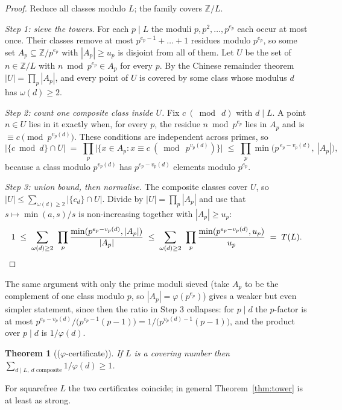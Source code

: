 \documentclass[11pt]{article}
\newtheorem{theorem}{Theorem}
\theoremstyle{definition}
\theoremstyle{remark}
\newcommand{\Z}{\mathbb{Z}}
\newcommand{\moniker}[1]{\textup{(#1)}}
\begin{document}
\begin{proof}
Reduce all classes modulo $L$; the family covers $\Z/L$.

\emph{Step 1: sieve the towers.} For each $p \mid L$ the moduli $p, p^2, \dots, p^{e_p}$ each occur at most once. Their classes remove at most $p^{e_p-1} + \dots + 1$ residues modulo $p^{e_p}$, so some set $A_p \subseteq \Z/p^{e_p}$ with $|A_p| \ge u_p$ is disjoint from all of them. Let $U$ be the set of $n \in \Z/L$ with $n \bmod p^{e_p} \in A_p$ for every $p$. By the Chinese remainder theorem $|U| = \prod_p |A_p|$, and every point of $U$ is covered by some class whose modulus $d$ has $\omega(d) \ge 2$.

\emph{Step 2: count one composite class inside $U$.} Fix $c \ (\bmod\ d)$ with $d \mid L$. A point $n \in U$ lies in it exactly when, for every $p$, the residue $n \bmod p^{e_p}$ lies in $A_p$ and is $\equiv c \pmod{p^{v_p(d)}}$. These conditions are independent across primes, so
\[
\bigl|\{c \bmod d\} \cap U\bigr| \;=\; \prod_p \bigl|\{x \in A_p : x \equiv c \ (\bmod\ p^{v_p(d)})\}\bigr| \;\le\; \prod_p \min\!\bigl(p^{\,e_p - v_p(d)},\ |A_p|\bigr),
\]
because a class modulo $p^{v_p(d)}$ has $p^{e_p - v_p(d)}$ elements modulo $p^{e_p}$.

\emph{Step 3: union bound, then normalise.} The composite classes cover $U$, so $|U| \le \sum_{\omega(d) \ge 2} |\{c_d\} \cap U|$. Divide by $|U| = \prod_p |A_p|$ and use that $s \mapsto \min(a,s)/s$ is non-increasing together with $|A_p| \ge u_p$:
\[
1 \;\le\; \sum_{\omega(d)\ge 2}\ \prod_p \frac{\min(p^{e_p - v_p(d)}, |A_p|)}{|A_p|} \;\le\; \sum_{\omega(d)\ge 2}\ \prod_p \frac{\min(p^{e_p - v_p(d)}, u_p)}{u_p} \;=\; T(L). \qedhere
\]
\end{proof}

The same argument with only the prime moduli sieved (take $A_p$ to be the complement of one class modulo $p$, so $|A_p| = \varphi(p^{e_p})$) gives a weaker but even simpler statement, since then the ratio in Step 3 collapses: for $p \mid d$ the $p$-factor is at most $p^{e_p - v_p(d)}/\bigl(p^{e_p-1}(p-1)\bigr) = 1/\bigl(p^{v_p(d)-1}(p-1)\bigr)$, and the product over $p \mid d$ is $1/\varphi(d)$.

\begin{theorem}[\moniker{$\varphi$-certificate}]\label{thm:phi}
If $L$ is a covering number then $\sum_{d \mid L,\ d \text{ composite}} 1/\varphi(d) \ge 1$.
\end{theorem}

For squarefree $L$ the two certificates coincide; in general Theorem~\ref{thm:tower} is at least as strong.
\end{document}
